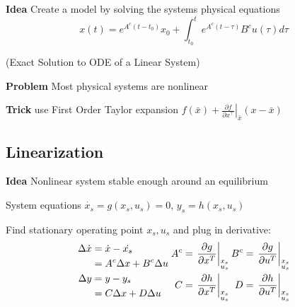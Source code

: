 
\textbf{Idea}
Create a model by solving the systems physical equations
\[
	x(t) = e^{A^c(t-t_0)}x_0 +
	\textstyle\int_{t_0}^{t}e^{A^c(t-\tau)}B^c u(\tau)d\tau
\]
\centerline{\scriptsize
	(Exact Solution to ODE of a Linear System)}

\textbf{Problem}
Most physical systems are nonlinear

\textbf{Trick}
use First Order Taylor expansion
$f(\bar{x}) + \left. \frac{\partial f}{\partial x^\top} \right
	\rvert_{\bar{x}} (x-\bar{x})$

\subsection{Linearization}
\textbf{Idea}
Nonlinear system  stable enough around an equilibrium

System equations
$\dot{x_s} = g(x_s,u_s)=0$, $y_s = h(x_s,u_s)$

Find stationary operating point $x_s,u_s$
and plug in derivative:
%
\begin{align*}
	\begin{aligned}
		\Delta \dot{x} & =\dot{x} -\dot{x_s}         \\
		               & = A^c\Delta x + B^c\Delta u \\
		\Delta y       & = y - y_s                   \\
		               & = C\Delta x + D\Delta u
	\end{aligned}
	\hspace{1mm}
	\begin{aligned}
		A^c             & =  \left.\frac{\partial g}{\partial x^T}\right| _{\substack{x_s                                                                    \\u_s}}
		\hspace{-1.4mm} & \hspace{-1.4mm}B^c                                              & =   \left.\frac{\partial g}{\partial u^T}\right| _{\substack{x_s \\u_s}}
		\\
		C               & =  \left.\frac{\partial h}{\partial x^T}\right| _{\substack{x_s                                                                    \\u_s}}
		\hspace{-1.4mm} & \hspace{-1.4mm}D                                                & =   \left.\frac{\partial h}{\partial u^T}\right| _{\substack{x_s \\u_s}}
	\end{aligned}
\end{align*}

